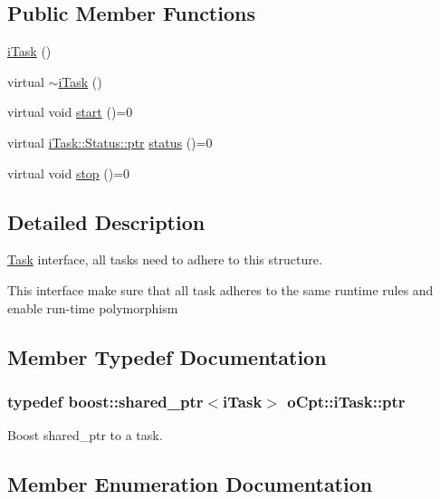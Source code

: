 \subsection*{Public Member Functions}
\begin{DoxyCompactItemize}
\item 
\hyperlink{classo_cpt_1_1i_task_ad4c22f3e6378785586bf951651478c53}{i\+Task} ()
\item 
virtual \hyperlink{classo_cpt_1_1i_task_aa2c1053421fff92430b5912e0d3c7fc7}{$\sim$i\+Task} ()
\item 
virtual void \hyperlink{classo_cpt_1_1i_task_aedd48e3c4df48aaae0738ce3863e222f}{start} ()=0
\item 
virtual \hyperlink{classo_cpt_1_1i_task_1_1_status_aaf766c58d038e2defc3de2dddb92d1eb}{i\+Task\+::\+Status\+::ptr} \hyperlink{classo_cpt_1_1i_task_a8d6126b2e337a0ab39fdef1d8d7b73b9}{status} ()=0
\item 
virtual void \hyperlink{classo_cpt_1_1i_task_aedb88813b16914598dee9561813e56e8}{stop} ()=0
\end{DoxyCompactItemize}


\subsection{Detailed Description}
\hyperlink{classo_cpt_1_1_task}{Task} interface, all tasks need to adhere to this structure. 

This interface make sure that all task adheres to the same runtime rules and enable run-\/time polymorphism 

\subsection{Member Typedef Documentation}
\subsubsection[{\texorpdfstring{ptr}{ptr}}]{\setlength{\rightskip}{0pt plus 5cm}typedef boost\+::shared\+\_\+ptr$<${\bf i\+Task}$>$ {\bf o\+Cpt\+::i\+Task\+::ptr}}\hypertarget{classo_cpt_1_1i_task_add2b02b5c97e63a1b7d6943ea4571543}{}\label{classo_cpt_1_1i_task_add2b02b5c97e63a1b7d6943ea4571543}


Boost shared\+\_\+ptr to a task. 



\subsection{Member Enumeration Documentation}
